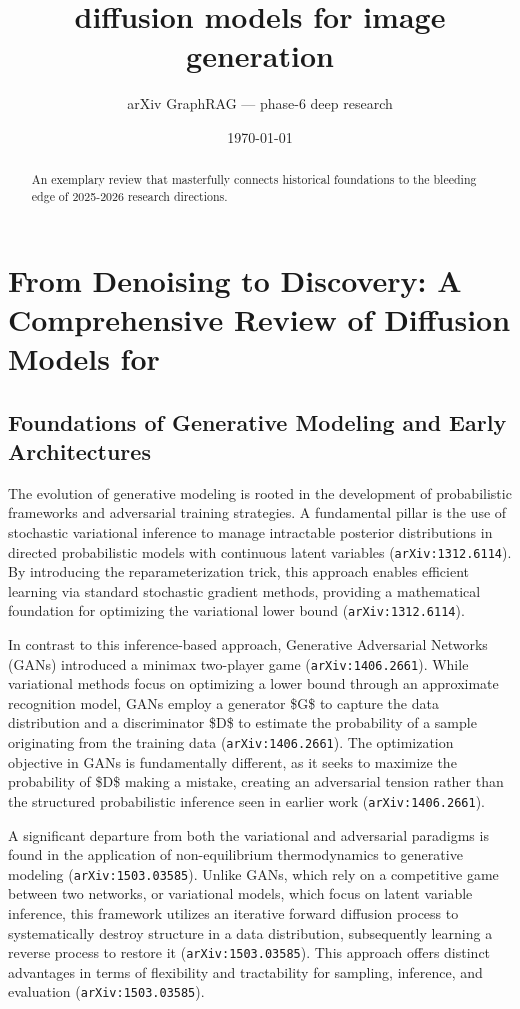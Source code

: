 \documentclass[11pt]{article}
\title{diffusion models for image generation}
\author{arXiv GraphRAG --- phase-6 deep research}
\date{\today}
\begin{document}
\maketitle

\begin{abstract}
An exemplary review that masterfully connects historical foundations to the bleeding edge of 2025-2026 research directions.
\end{abstract}

\section{From Denoising to Discovery: A Comprehensive Review of Diffusion Models for}

\subsection{Foundations of Generative Modeling and Early Architectures}

The evolution of generative modeling is rooted in the development of probabilistic frameworks and adversarial training strategies. A fundamental pillar is the use of stochastic variational inference to manage intractable posterior distributions in directed probabilistic models with continuous latent variables (\texttt{arXiv:1312.6114}). By introducing the reparameterization trick, this approach enables efficient learning via standard stochastic gradient methods, providing a mathematical foundation for optimizing the variational lower bound (\texttt{arXiv:1312.6114}).

In contrast to this inference-based approach, Generative Adversarial Networks (GANs) introduced a minimax two-player game (\texttt{arXiv:1406.2661}). While variational methods focus on optimizing a lower bound through an approximate recognition model, GANs employ a generator \$G\$ to capture the data distribution and a discriminator \$D\$ to estimate the probability of a sample originating from the training data (\texttt{arXiv:1406.2661}). The optimization objective in GANs is fundamentally different, as it seeks to maximize the probability of \$D\$ making a mistake, creating an adversarial tension rather than the structured probabilistic inference seen in earlier work (\texttt{arXiv:1406.2661}).

A significant departure from both the variational and adversarial paradigms is found in the application of non-equilibrium thermodynamics to generative modeling (\texttt{arXiv:1503.03585}). Unlike GANs, which rely on a competitive game between two networks, or variational models, which focus on latent variable inference, this framework utilizes an iterative forward diffusion process to systematically destroy structure in a data distribution, subsequently learning a reverse process to restore it (\texttt{arXiv:1503.03585}). This approach offers distinct advantages in terms of flexibility and tractability for sampling, inference, and evaluation (\texttt{arXiv:1503.03585}).
\end{document}

